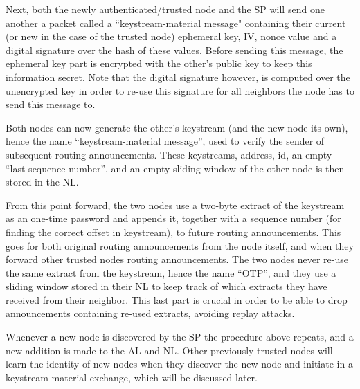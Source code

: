 Next, both the newly authenticated/trusted node and the \ac{SP} will send one
another a packet called a ``keystream-material message" containing their
current (or new in the case of the trusted node) ephemeral key, \ac{IV}, nonce
value and a digital signature over the hash of these values. Before sending
this message, the ephemeral key part is encrypted with the other's public key
to keep this information secret. Note that the digital signature however, is
computed over the unencrypted key in order to re-use this signature for all
neighbors the node has to send this message to.

Both nodes can now generate the other's keystream (and the new node its own),
hence the name ``keystream-material message'', used to verify the sender of
subsequent routing announcements. These keystreams, address, id, an empty ``last
sequence number'', and an empty sliding window of the other node is then stored
in the \ac{NL}.


From this point forward, the two nodes use a two-byte extract of the keystream
as an one-time password and appends it, together with a sequence number (for
finding the correct offset in keystream), to future routing announcements. This
goes for both original routing announcements from the node itself, and when
they forward other trusted nodes routing announcements. The two nodes never
re-use the same extract from the keystream, hence the name ``\acf{OTP}'', and
they use a sliding window stored in their \ac{NL} to keep track of which
extracts they have received from their neighbor. This last part is crucial in
order to be able to drop announcements containing re-used extracts, avoiding
replay attacks. 

Whenever a new node is discovered by the \ac{SP} the procedure above repeats,
and a new addition is made to the \ac{AL} and \ac{NL}. Other previously
trusted nodes will learn the identity of new nodes when they discover the new
node and initiate in a keystream-material exchange, which will be discussed
later.


